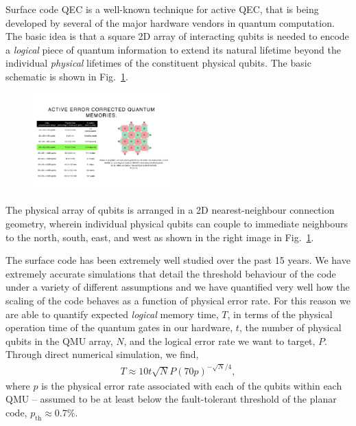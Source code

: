 \documentclass[twocolumn, aps, rmp, amsmath, amssymb, nofootinbib, superscriptaddress, longbibliography, floatfix, table-of-contents, eqsecnum]{revtex4-2}
\newcommand{\comment}[1]{{\color{blue}{\textbf{#1}}}}
\begin{document}
\comment{Peter up to here}

Surface code QEC is a well-known technique for active QEC, that is being developed by several of the major hardware vendors in quantum computation. The basic idea is that a square 2D array of interacting qubits is needed to encode a \textit{logical} piece of quantum information to extend its natural lifetime beyond the individual \textit{physical} lifetimes of the constituent physical qubits. The basic schematic is shown in Fig.~\ref{fig:array}. 

\begin{figure}[htbp!]
	\includegraphics[clip=true, width=0.475\textwidth]{array}
	\caption{} \label{fig:array}
\end{figure}

The physical array of qubits is arranged in a 2D nearest-neighbour connection geometry, wherein individual physical qubits can couple to immediate neighbours to the north, south, east, and west as shown in the right image in Fig.~\ref{fig:array}. 

The surface code has been extremely well studied over the past 15 years. We have extremely accurate simulations that detail the threshold behaviour of the code under a variety of different assumptions and we have quantified very well how the scaling of the code behaves as a function of physical error rate. For this reason we are able to quantify expected \textit{logical} memory time, $T$, in terms of the physical operation time of the quantum gates in our hardware, $t$, the number of physical qubits in the QMU array, $N$, and the logical error rate we want to target, $P$. Through direct numerical simulation, we find,
\begin{align} \label{eq:scale}
T \approx 10t\sqrt{N} P(70p)^{-\sqrt{N}/4},
\end{align}
where $p$ is the physical error rate associated with each of the qubits within each QMU -- assumed to be at least below the fault-tolerant threshold of the planar code, $p_\mathrm{th} \approx 0.7\%$.
\end{document}
